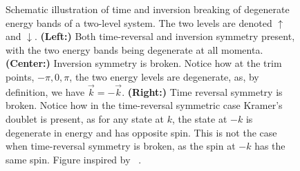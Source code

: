 \begin{figure}[h]
  \caption{Schematic illustration of time and inversion breaking of degenerate energy bands of a two-level system.
    The  two levels are denoted $\uparrow$ and $\downarrow$.
    \textbf{(Left:)} Both time-reversal and inversion symmetry present, with the two energy bands being degenerate at all momenta.
    \textbf{(Center:)} Inversion symmetry is broken. Notice how at the \gls{trim} points, $-\pi, 0, \pi$, the two energy levels are degenerate, as, by definition, we have $\vec{k} = -\vec{k}$.
    \textbf{(Right:)} Time reversal symmetry is broken.
    Notice how in the time-reversal symmetric case Kramer's doublet is present, as for any state at $k$, the state at $-k$ is degenerate  in energy and has opposite spin.
    This is not the case when time-reversal symmetry is broken, as the spin at  $-k$ has the same spin.
    Figure inspired by \citeauthor{ramazashviliZeemanSpinorbitCoupling2019}~\cite{ramazashviliZeemanSpinorbitCoupling2019}.
  }
  \label{fig:symmetry_considerations}
\end{figure}


